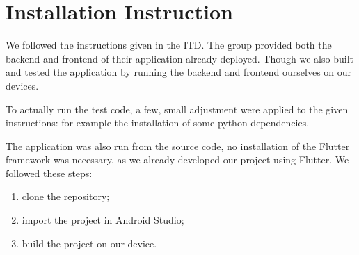 \chapter{Installation Instruction}
We followed the instructions given in the ITD. The group provided both the backend and frontend of their application already deployed.
Though we also built and tested the application by running the backend and frontend ourselves on our devices.

To actually run the test code, a few, small adjustment were applied to the given instructions: for example the installation of some python dependencies.

The application was also run from the source code, no installation of the Flutter framework was necessary, as we already developed our project using Flutter.\newline
We followed these steps:
\begin{enumerate}
	\item clone the repository;
	\item import the project in Android Studio;
	\item build the project on our device.
\end{enumerate}
